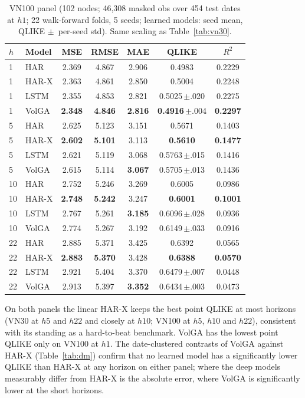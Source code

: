 \documentclass[runningheads]{llncs}
\begin{document}
\begin{table}[t]
\centering
\caption{VN100 panel (102 nodes; 46{,}308 masked obs over 454 test dates at $h1$; 22 walk-forward
folds, 5 seeds; learned models: seed mean, QLIKE $\pm$~per-seed std). Same scaling as
Table~\ref{tab:vn30}.}
\label{tab:vn100}
\footnotesize
\setlength{\tabcolsep}{5pt}
\begin{tabular}{llccccc}
\toprule
$h$ & Model & MSE & RMSE & MAE & QLIKE & $R^2$ \\
\midrule
1 & HAR   & 2.369 & 4.867 & 2.906 & 0.4983 & 0.2229 \\
1 & HAR-X & 2.363 & 4.861 & 2.850 & 0.5004 & 0.2248 \\
1 & LSTM  & 2.355 & 4.853 & 2.821 & 0.5025\,$\pm$.020 & 0.2275 \\
1 & VolGA & \textbf{2.348} & \textbf{4.846} & \textbf{2.816} & \textbf{0.4916}\,$\pm$.004 & \textbf{0.2297} \\
\midrule
5 & HAR   & 2.625 & 5.123 & 3.151 & 0.5671 & 0.1403 \\
5 & HAR-X & \textbf{2.602} & \textbf{5.101} & 3.113 & \textbf{0.5610} & \textbf{0.1477} \\
5 & LSTM  & 2.621 & 5.119 & 3.068 & 0.5763\,$\pm$.015 & 0.1416 \\
5 & VolGA & 2.615 & 5.114 & \textbf{3.067} & 0.5705\,$\pm$.013 & 0.1436 \\
\midrule
10 & HAR   & 2.752 & 5.246 & 3.269 & 0.6005 & 0.0986 \\
10 & HAR-X & \textbf{2.748} & \textbf{5.242} & 3.247 & \textbf{0.6001} & \textbf{0.1001} \\
10 & LSTM  & 2.767 & 5.261 & \textbf{3.185} & 0.6096\,$\pm$.028 & 0.0936 \\
10 & VolGA & 2.774 & 5.267 & 3.192 & 0.6149\,$\pm$.033 & 0.0916 \\
\midrule
22 & HAR   & 2.885 & 5.371 & 3.425 & 0.6392 & 0.0565 \\
22 & HAR-X & \textbf{2.883} & \textbf{5.370} & 3.428 & \textbf{0.6388} & \textbf{0.0570} \\
22 & LSTM  & 2.921 & 5.404 & 3.370 & 0.6479\,$\pm$.007 & 0.0448 \\
22 & VolGA & 2.913 & 5.397 & \textbf{3.352} & 0.6434\,$\pm$.003 & 0.0473 \\
\bottomrule
\end{tabular}
\end{table}

On both panels the linear HAR-X keeps the best point QLIKE at most horizons (VN30 at $h5$ and $h22$
and closely at $h10$; VN100 at $h5$, $h10$ and $h22$), consistent with its standing as a hard-to-beat
benchmark. VolGA has the lowest point QLIKE only on VN100 at $h1$. The date-clustered contrasts of
VolGA against HAR-X (Table~\ref{tab:dm}) confirm that no learned model has a significantly lower QLIKE
than HAR-X at any horizon on either panel; where the deep models measurably differ from HAR-X is the
absolute error, where VolGA is significantly lower at the short horizons.
\end{document}
